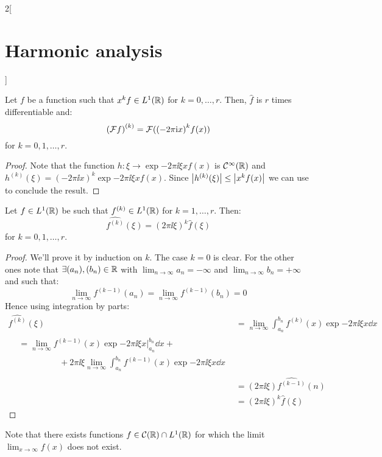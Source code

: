 \documentclass[../../../main_math.tex]{subfiles}
\begin{document}
\begin{multicols}{2}[\section{Harmonic analysis}]
\begin{proposition}
    Let $f$ be a function such that $x^k f\in L^1(\mathbb{R})$ for $k=0,\ldots,r$. Then, $\widehat{f}$ is $r$ times differentiable and:
    $${(\mathcal{F} f)}^{(k)}=\mathcal{F}({(-2\pi\mathrm{i} x)}^kf(x))$$
    for $k=0,1,\ldots, r$.
  \end{proposition}
  \begin{proof}
    Note that the function $h:\xi\rightarrow\exp{-2\pi\ii \xi x}f(x)$ is $\mathcal{C}^\infty(\mathbb{R})$ and $h^{(k)}(\xi)={(-2\pi\ii x)}^k\exp{-2\pi\ii \xi x}f(x)$. Since $\abs{h^{(k)}(\xi)}\leq \abs{x^kf(x)}$ we can use  to conclude the result.
  \end{proof}
  \begin{proposition}\label{HA:diffFourierTransf}
    Let $f\in L^1(\mathbb{R})$ be such that $f^{(k)}\in L^1(\mathbb{R})$ for $k=1,\ldots,r$. Then: $$\widehat{f^{(k)}}(\xi)={(2\pi\ii\xi)}^k\widehat{f}(\xi)$$ for $k=0,1,\ldots, r$.
  \end{proposition}
  \begin{proof}
    We'll prove it by induction on $k$. The case $k=0$ is clear.
    For the other ones note that $\exists(a_n),(b_n)\in\mathbb{R}$ with $\displaystyle\lim_{n\to\infty}a_n=-\infty$ and $\displaystyle\lim_{n\to\infty}b_n=+\infty$ and such that:
    $$\lim_{n\to\infty}f^{(k-1)}(a_n)=\lim_{n\to\infty}f^{(k-1)}(b_n)=0$$
    Hence using integration by parts:
    \begin{align*}
      \widehat{f^{(k)}}(\xi) & =\lim_{n\to\infty}\int_{a_n}^{b_n} f^{(k)}(x)\exp{-2\pi\ii \xi x}\dd{x}  \\
      \begin{split}
        & =\lim_{n\to\infty}  f^{(k-1)}(x)\exp{-2\pi\ii \xi x}\Big|_{a_n}^{b_n}\dd{x} +                   \\
        & \hspace{2cm}+2\pi\ii \xi\lim_{n\to\infty}\int_{a_n}^{b_n}f^{(k-1)}(x)\exp{-2\pi\ii \xi x}\dd{x}
      \end{split} \\
                             & =\left(2\pi\ii \xi\right)\widehat{f^{(k-1)}}(n)                          \\
                             & ={\left(2\pi\ii \xi\right)}^k\widehat{f}(\xi)
    \end{align*}
  \end{proof}
  \begin{remark}
    Note that there exists functions $f\in\mathcal{C}(\mathbb{R})\cap L^1(\mathbb{R})$ for which the limit $\displaystyle\lim_{x\to\infty} f(x)$ does not exist.
  \end{remark}

\end{multicols}
\end{document}
